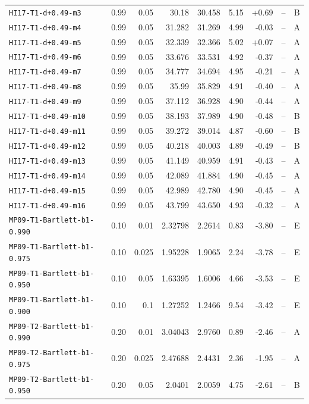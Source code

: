 \begin{longtable}{@{}lrrrrrrrc@{}}
\texttt{HI17-T1-d+0.49-m3} & 0.99 & 0.05 & 30.18 & 30.458 & 5.15 & +0.69 & -- & B\\
\texttt{HI17-T1-d+0.49-m4} & 0.99 & 0.05 & 31.282 & 31.269 & 4.99 & -0.03 & -- & A\\
\texttt{HI17-T1-d+0.49-m5} & 0.99 & 0.05 & 32.339 & 32.366 & 5.02 & +0.07 & -- & A\\
\texttt{HI17-T1-d+0.49-m6} & 0.99 & 0.05 & 33.676 & 33.531 & 4.92 & -0.37 & -- & A\\
\texttt{HI17-T1-d+0.49-m7} & 0.99 & 0.05 & 34.777 & 34.694 & 4.95 & -0.21 & -- & A\\
\texttt{HI17-T1-d+0.49-m8} & 0.99 & 0.05 & 35.99 & 35.829 & 4.91 & -0.40 & -- & A\\
\texttt{HI17-T1-d+0.49-m9} & 0.99 & 0.05 & 37.112 & 36.928 & 4.90 & -0.44 & -- & A\\
\texttt{HI17-T1-d+0.49-m10} & 0.99 & 0.05 & 38.193 & 37.989 & 4.90 & -0.48 & -- & B\\
\texttt{HI17-T1-d+0.49-m11} & 0.99 & 0.05 & 39.272 & 39.014 & 4.87 & -0.60 & -- & B\\
\texttt{HI17-T1-d+0.49-m12} & 0.99 & 0.05 & 40.218 & 40.003 & 4.89 & -0.49 & -- & B\\
\texttt{HI17-T1-d+0.49-m13} & 0.99 & 0.05 & 41.149 & 40.959 & 4.91 & -0.43 & -- & A\\
\texttt{HI17-T1-d+0.49-m14} & 0.99 & 0.05 & 42.089 & 41.884 & 4.90 & -0.45 & -- & A\\
\texttt{HI17-T1-d+0.49-m15} & 0.99 & 0.05 & 42.989 & 42.780 & 4.90 & -0.45 & -- & A\\
\texttt{HI17-T1-d+0.49-m16} & 0.99 & 0.05 & 43.799 & 43.650 & 4.93 & -0.32 & -- & A\\
\texttt{MP09-T1-Bartlett-b1-0.990} & 0.10 & 0.01 & 2.32798 & 2.2614 & 0.83 & -3.80 & -- & E\\
\texttt{MP09-T1-Bartlett-b1-0.975} & 0.10 & 0.025 & 1.95228 & 1.9065 & 2.24 & -3.78 & -- & E\\
\texttt{MP09-T1-Bartlett-b1-0.950} & 0.10 & 0.05 & 1.63395 & 1.6006 & 4.66 & -3.53 & -- & E\\
\texttt{MP09-T1-Bartlett-b1-0.900} & 0.10 & 0.1 & 1.27252 & 1.2466 & 9.54 & -3.42 & -- & E\\
\texttt{MP09-T2-Bartlett-b1-0.990} & 0.20 & 0.01 & 3.04043 & 2.9760 & 0.89 & -2.46 & -- & A\\
\texttt{MP09-T2-Bartlett-b1-0.975} & 0.20 & 0.025 & 2.47688 & 2.4431 & 2.36 & -1.95 & -- & A\\
\texttt{MP09-T2-Bartlett-b1-0.950} & 0.20 & 0.05 & 2.0401 & 2.0059 & 4.75 & -2.61 & -- & B\\

\end{longtable}
